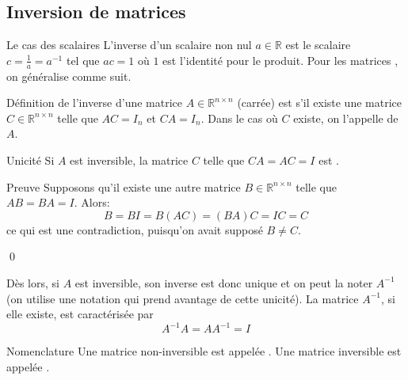 \documentclass[a4paper]{article}
\begin{document}
\subsection{Inversion de matrices}
\begin{parag}{Le cas des scalaires}
    L'inverse d'un scalaire non nul $a \in \mathbb{R}$ est le scalaire $c = \frac{1}{a} = a^{-1}$ tel que $ac = 1$ où $1$ est l'identité pour le produit. Pour les matrices , on généralise comme suit.
\end{parag}

\begin{parag}{Définition de l'inverse d'une matrice}
    $A \in \mathbb{R}^{n \times n}$ (carrée) est  s'il existe une matrice $C \in \mathbb{R}^{n \times n}$ telle que $AC = I_n$ et $CA = I_n$. Dans le cas où $C$ existe, on l'appelle  de $A$.
\end{parag}

\begin{parag}{Unicité}
    Si $A$ est inversible, la matrice $C$ telle que $CA = AC = I$ est .

    \begin{subparag}{Preuve}
        Supposons qu'il existe une autre matrice $B \in \mathbb{R}^{n \times n}$ telle que $AB = BA = I$. Alors:
        \[B = BI = B\left(AC\right) = \left(BA\right)C = IC = C\]
        ce qui est une contradiction, puisqu'on avait supposé $B \neq C$.

        \qed
    \end{subparag}

    Dès lors, si $A$ est inversible, son inverse est donc unique et on peut la noter $A^{-1}$ (on utilise une notation qui prend avantage de cette unicité). La matrice $A^{-1}$, si elle existe, est caractérisée par
    \[A^{-1}A = A A^{-1} = I\]

\end{parag}

\begin{parag}{Nomenclature}
    Une matrice non-inversible est appelée . Une matrice inversible est appelée .
\end{parag}
\end{document}
